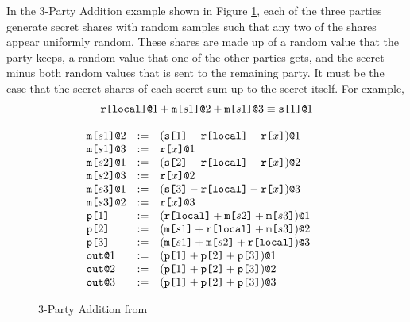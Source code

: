 \documentclass{article}
\begin{document}
In the 3-Party Addition example shown in Figure \ref{fig-3-party-add}, each of the three parties generate secret shares with random samples such that any two of the shares appear uniformly random. These shares are made up of a random value that the party keeps, a random value that one of the other parties gets, and the secret minus both random values that is sent to the remaining party. It must be the case that the secret shares of each secret sum up to the secret itself. For example, $$\texttt{r[}\mathtt{local}\texttt{]}\texttt{@}1 + \texttt{m[}s1\texttt{]}\texttt{@}2 + \texttt{m[}s1\texttt{]}\texttt{@}3 \equiv \texttt{s[}1\texttt{]}\texttt{@}1$$


\begin{figure}
{\footnotesize
$$
\begin{array}{c@{\qquad}c}
\begin{array}{llllll}
  \elab{\mesg{s1}}{2} &:=& \elab{(\secret{1} \fminus \locflip \fminus \flip{x})}{1} \\ 
  \elab{\mesg{s1}}{3} &:=& \elab{\flip{x}}{1} \\ 
  \elab{\mesg{s2}}{1} &:=& \elab{(\secret{2} \fminus \locflip \fminus \flip{x})}{2} \\ 
  \elab{\mesg{s2}}{3} &:=& \elab{\flip{x}}{2} \\ 
  \elab{\mesg{s3}}{1} &:=& \elab{(\secret{3} \fminus \locflip \fminus \flip{x})}{3} \\ 
  \elab{\mesg{s3}}{2} &:=& \elab{\flip{x}}{3} \\
  \rvl{1} &:=& \elab{(\locflip \fplus \mesg{s2} \fplus \mesg{s3})}{1} \\ 
  \rvl{2} &:=& \elab{(\mesg{s1} \fplus \locflip \fplus \mesg{s3})}{2} \\
  \rvl{3} &:=& \elab{(\mesg{s1} \fplus \mesg{s2} \fplus \locflip)}{3} \\
  \out{1} &:=& \elab{(\rvl{1} \fplus \rvl{2} + \rvl{3})}{1}\\
  \out{2} &:=& \elab{(\rvl{1} \fplus \rvl{2} + \rvl{3})}{2}\\
  \out{3} &:=& \elab{(\rvl{1} \fplus \rvl{2} + \rvl{3})}{3}
\end{array}
\end{array}$$
}
\caption{3-Party Addition from \cite{skalka-near-esop25}}
\label{fig-3-party-add}
\end{figure}
\end{document}
